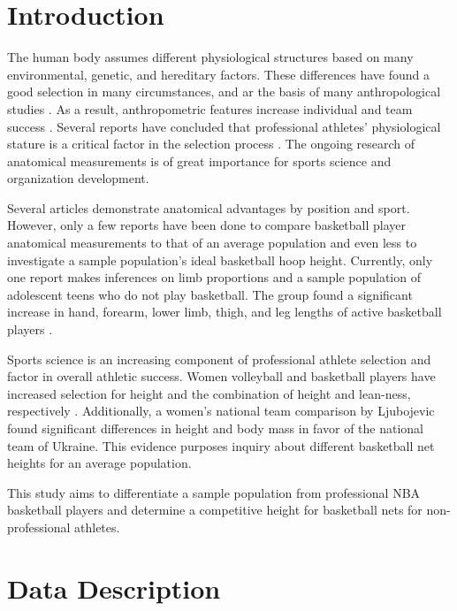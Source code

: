 \documentclass[]{article}
\begin{document}
\vskip -8.5pt




\noindent  

\section{Introduction}
\label{sec:intro}

The human body assumes different physiological structures based on many
environmental, genetic, and hereditary factors. These differences have
found a good selection in many circumstances, and ar the basis of many
anthropological studies \citep{anzellini:2020}. As a result,
anthropometric features increase individual and team success
\citep{strumbelj:2014}. Several reports have concluded that professional
athletes' physiological stature is a critical factor in the selection
process \citep{vaquera:2015}. The ongoing research of anatomical
measurements is of great importance for sports science and organization
development.

Several articles demonstrate anatomical advantages by position and
sport. However, only a few reports have been done to compare basketball
player anatomical measurements to that of an average population and even
less to investigate a sample population's ideal basketball hoop height.
Currently, only one report makes inferences on limb proportions and a
sample population of adolescent teens who do not play basketball. The
group found a significant increase in hand, forearm, lower limb, thigh,
and leg lengths of active basketball players \citep{korkmaz:2020}.

Sports science is an increasing component of professional athlete
selection and factor in overall athletic success. Women volleyball and
basketball players have increased selection for height and the
combination of height and lean-ness, respectively \citep{bayios:2006}.
Additionally, a women's national team comparison by Ljubojevic
\citet{ljubojevic:2020} found significant differences in height and body
mass in favor of the national team of Ukraine. This evidence purposes
inquiry about different basketball net heights for an average
population.

This study aims to differentiate a sample population from professional
NBA basketball players and determine a competitive height for basketball
nets for non-professional athletes.

\section{Data Description}
\label{sec:data}
\end{document}
